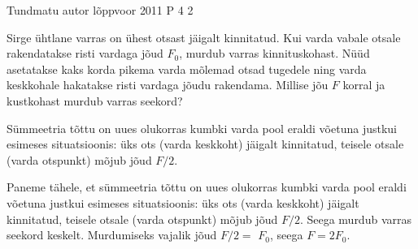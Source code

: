 {Tundmatu autor} %
{lõppvoor} %
{2011} %
{P 4} %
{2} %
{

\ifStatement
Sirge ühtlane varras on ühest otsast jäigalt kinnitatud. Kui varda vabale otsale rakendatakse risti vardaga jõud $F_0$, murdub varras kinnituskohast. Nüüd asetatakse kaks korda pikema varda mõlemad otsad tugedele ning varda keskkohale hakatakse risti vardaga jõudu rakendama. Millise jõu $F$ korral ja kustkohast murdub varras seekord?
\fi

\ifHint
Sümmeetria tõttu on uues olukorras kumbki varda pool eraldi võetuna justkui esimeses situatsioonis: üks ots (varda keskkoht) jäigalt kinnitatud, teisele otsale (varda otspunkt) mõjub jõud $F/2$.
\fi

\ifSolution
Paneme tähele, et sümmeetria tõttu on uues olukorras kumbki varda pool eraldi võetuna justkui esimeses situatsioonis: üks ots (varda keskkoht) jäigalt kinnitatud, teisele otsale (varda otspunkt) mõjub jõud $F/2$. Seega murdub varras seekord keskelt. Murdumiseks vajalik jõud $F/2 =$ $F_0$, seega $F = 2F_0$.
\fi
}
